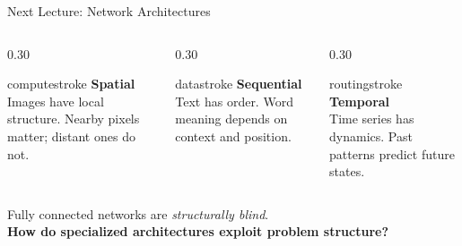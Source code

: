 \documentclass[aspectratio=169, 12pt]{beamer}
\begin{document}
\begin{frame}{Next Lecture: Network Architectures}

\footnotesize
\begin{columns}[c]
  \begin{column}{0.30\textwidth}
    \centering
    \begin{mlsyscard}{computestroke}
    \centering
    {\large\bfseries Spatial}\\[0.1cm]
    {\footnotesize Images have local structure. Nearby pixels matter; distant ones do not.}
    \end{mlsyscard}
  \end{column}
  \begin{column}{0.30\textwidth}
    \centering
    \begin{mlsyscard}{datastroke}
    \centering
    {\large\bfseries Sequential}\\[0.1cm]
    {\footnotesize Text has order. Word meaning depends on context and position.}
    \end{mlsyscard}
  \end{column}
  \begin{column}{0.30\textwidth}
    \centering
    \begin{mlsyscard}{routingstroke}
    \centering
    {\large\bfseries Temporal}\\[0.1cm]
    {\footnotesize Time series has dynamics. Past patterns predict future states.}
    \end{mlsyscard}
  \end{column}
\end{columns}

\vspace{0.3cm}
\centering
{\normalsize Fully connected networks are \emph{structurally blind}.\\[0.1cm]
\textbf{How do specialized architectures exploit problem structure?}}

\end{frame}


\appendix
\end{document}
